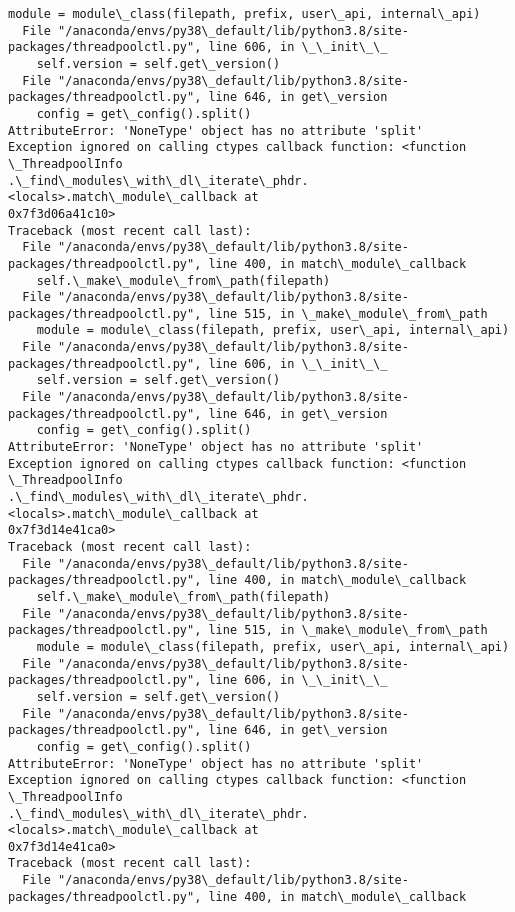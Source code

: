 \documentclass[11pt]{article}
\begin{document}
\begin{Verbatim}[commandchars=\\\{\}]
    module = module\_class(filepath, prefix, user\_api, internal\_api)
  File "/anaconda/envs/py38\_default/lib/python3.8/site-
packages/threadpoolctl.py", line 606, in \_\_init\_\_
    self.version = self.get\_version()
  File "/anaconda/envs/py38\_default/lib/python3.8/site-
packages/threadpoolctl.py", line 646, in get\_version
    config = get\_config().split()
AttributeError: 'NoneType' object has no attribute 'split'
Exception ignored on calling ctypes callback function: <function \_ThreadpoolInfo
.\_find\_modules\_with\_dl\_iterate\_phdr.<locals>.match\_module\_callback at
0x7f3d06a41c10>
Traceback (most recent call last):
  File "/anaconda/envs/py38\_default/lib/python3.8/site-
packages/threadpoolctl.py", line 400, in match\_module\_callback
    self.\_make\_module\_from\_path(filepath)
  File "/anaconda/envs/py38\_default/lib/python3.8/site-
packages/threadpoolctl.py", line 515, in \_make\_module\_from\_path
    module = module\_class(filepath, prefix, user\_api, internal\_api)
  File "/anaconda/envs/py38\_default/lib/python3.8/site-
packages/threadpoolctl.py", line 606, in \_\_init\_\_
    self.version = self.get\_version()
  File "/anaconda/envs/py38\_default/lib/python3.8/site-
packages/threadpoolctl.py", line 646, in get\_version
    config = get\_config().split()
AttributeError: 'NoneType' object has no attribute 'split'
Exception ignored on calling ctypes callback function: <function \_ThreadpoolInfo
.\_find\_modules\_with\_dl\_iterate\_phdr.<locals>.match\_module\_callback at
0x7f3d14e41ca0>
Traceback (most recent call last):
  File "/anaconda/envs/py38\_default/lib/python3.8/site-
packages/threadpoolctl.py", line 400, in match\_module\_callback
    self.\_make\_module\_from\_path(filepath)
  File "/anaconda/envs/py38\_default/lib/python3.8/site-
packages/threadpoolctl.py", line 515, in \_make\_module\_from\_path
    module = module\_class(filepath, prefix, user\_api, internal\_api)
  File "/anaconda/envs/py38\_default/lib/python3.8/site-
packages/threadpoolctl.py", line 606, in \_\_init\_\_
    self.version = self.get\_version()
  File "/anaconda/envs/py38\_default/lib/python3.8/site-
packages/threadpoolctl.py", line 646, in get\_version
    config = get\_config().split()
AttributeError: 'NoneType' object has no attribute 'split'
Exception ignored on calling ctypes callback function: <function \_ThreadpoolInfo
.\_find\_modules\_with\_dl\_iterate\_phdr.<locals>.match\_module\_callback at
0x7f3d14e41ca0>
Traceback (most recent call last):
  File "/anaconda/envs/py38\_default/lib/python3.8/site-
packages/threadpoolctl.py", line 400, in match\_module\_callback

\end{Verbatim}
\end{document}
